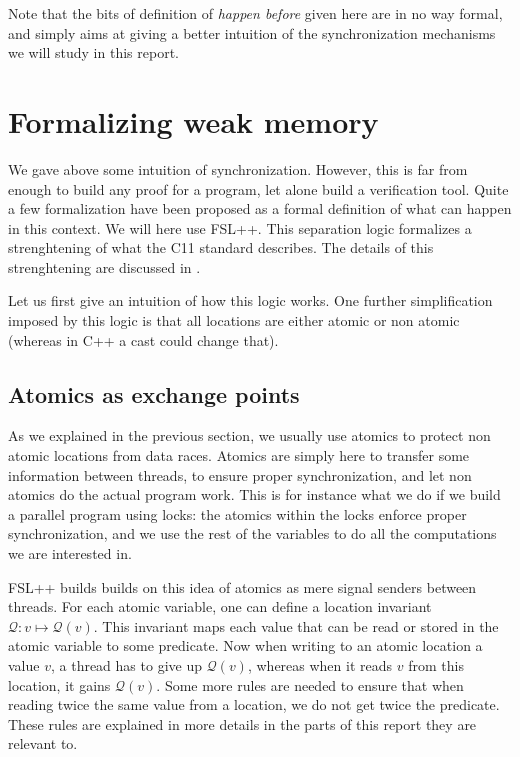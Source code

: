 Note that the bits of definition of \emph{happen before} given here are in no way formal, and simply aims at giving a better intuition of the synchronization mechanisms we will study in this report.

\section{Formalizing weak memory}
We gave above some intuition of synchronization. However, this is far from enough to build any proof for a program, let alone build a verification tool. Quite a few formalization have been proposed as a formal definition of what can happen in this context. We will here use FSL++\cite{fsl}. This separation logic formalizes a strenghtening of what the C11 standard describes. The details of this strenghtening are discussed in \cite{fsl}.

Let us first give an intuition of how this logic works. One further simplification imposed by this logic is that all locations are either atomic or non atomic (whereas in C++ a cast could change that).

\subsection{Atomics as exchange points}
As we explained in the previous section, we usually use atomics to protect non atomic locations from data races. Atomics are simply here to transfer some information between threads, to ensure proper synchronization, and let non atomics do the actual program work. This is for instance what we do if we build a parallel program using locks: the atomics within the locks enforce proper synchronization, and we use the rest of the variables to do all the computations we are interested in. 

FSL++ builds builds on this idea of atomics as mere signal senders between threads. For each atomic variable, one can define a location invariant $\mathcal{Q}: v \mapsto \mathcal{Q}(v)$. This invariant maps each value that can be read or stored in the atomic variable to some predicate. Now when writing to an atomic location a value $v$, a thread has to give up $\mathcal{Q}(v)$, whereas when it reads $v$ from this location, it gains $\mathcal{Q}(v)$. Some more rules are needed to ensure that when reading twice the same value from a location, we do not get twice the predicate. These rules are explained in more details in the parts of this report they are relevant to.

